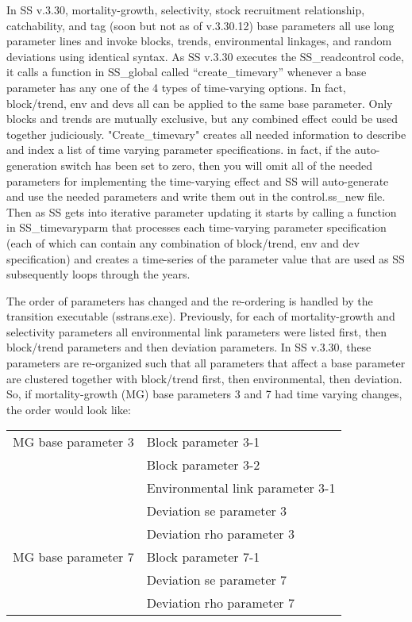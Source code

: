 In SS v.3.30, mortality-growth, selectivity, stock recruitment relationship, catchability, and tag (soon but not as of v.3.30.12) base parameters all use long parameter lines and invoke blocks, trends, environmental linkages, and random deviations using identical syntax.  As SS v.3.30 executes the SS\_readcontrol code, it calls a function in SS\_global called “create\_timevary” whenever a base parameter has any one of the 4 types of time-varying options.  In fact, block/trend, env and devs all can be applied to the same base parameter. Only blocks and trends are mutually exclusive, but any combined effect could be used together judiciously.  "Create\_timevary" creates all needed information to describe and index a list of time varying parameter specifications.  in fact, if the auto-generation switch has been set to zero, then you will omit all of the needed parameters for implementing the time-varying effect and SS will auto-generate and use the needed parameters and write them out in the control.ss\_new file. Then as SS gets into iterative parameter updating it starts by calling a function in SS\_timevaryparm that processes each time-varying parameter specification (each of which can contain any combination of block/trend, env and dev specification) and creates a time-series of the parameter value that are used as SS subsequently loops through the years.

The order of parameters has changed and the re-ordering is handled by the transition executable (sstrans.exe).  Previously, for each of mortality-growth and selectivity parameters all environmental link parameters were listed first, then block/trend parameters and then deviation parameters.  In SS v.3.30, these parameters are re-organized such that all parameters that affect a base parameter are clustered together with block/trend first, then environmental, then deviation.  So, if mortality-growth (MG) base parameters 3 and 7 had time varying changes, the order would look like:
 
 \begin{center}
 	\begin{longtable}{p{5cm} p{10cm}}
	 	\hline
	 	MG base parameter 3 & Block parameter 3-1\Tstrut\\
	 	                    & Block parameter 3-2\\
	 	                    & Environmental link parameter 3-1\\
	 	                    & Deviation se parameter 3 \\
	 	                    & Deviation rho parameter 3 \Bstrut\\
		MG base parameter 7 & Block parameter 7-1 \\
							& Deviation se parameter 7 \\
							& Deviation rho parameter 7 \Bstrut\\
		\hline	 	                    
	 	       
 	\end{longtable}
 \end{center}

